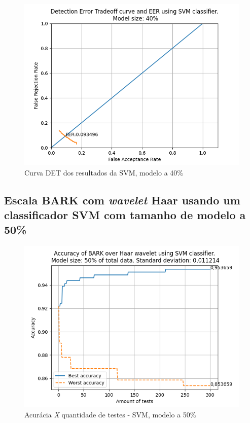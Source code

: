 			\begin{figure}[h]
				\centering
				\includegraphics[width=.8\linewidth]{images/results/det/DET_SVM_40}
				\caption{Curva DET dos resultados da SVM, modelo a 40\%}
				\label{fig:detsvm40}
			\end{figure}

			
	
			\forceNewPage
		\subsection{Escala BARK com \textit{wavelet} Haar usando um classificador SVM com tamanho de modelo a 50\%}
			\begin{figure}[ht]
				\centering
				\includegraphics{images/results/confusionMatrices/classifier_SVM_50.png}
				\caption{Acurácia \textit{X} quantidade de testes - SVM, modelo a 50\%}
				\label{fig:classifiersvm50}
			\end{figure}
		
